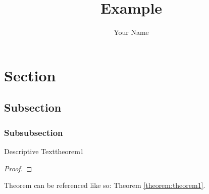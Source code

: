 \documentclass[11pt]{notes}
\title{\bf {\Huge
	Example
}}
\author{ 
	Your Name
}
\date{}
\begin{document}
\maketitle

\section{Section}
\subsection{Subsection}
\lipsum[1]
\subsubsection{Subsubsection}

\begin{theorem}{Descriptive Text}{theorem1}
	\lipsum[2]
\end{theorem}
\begin{proof}
	\lipsum[3]
\end{proof}

\noindent
Theorem can be referenced like so: Theorem \ref{theorem:theorem1}.

\lipsum[4]
\end{document}
